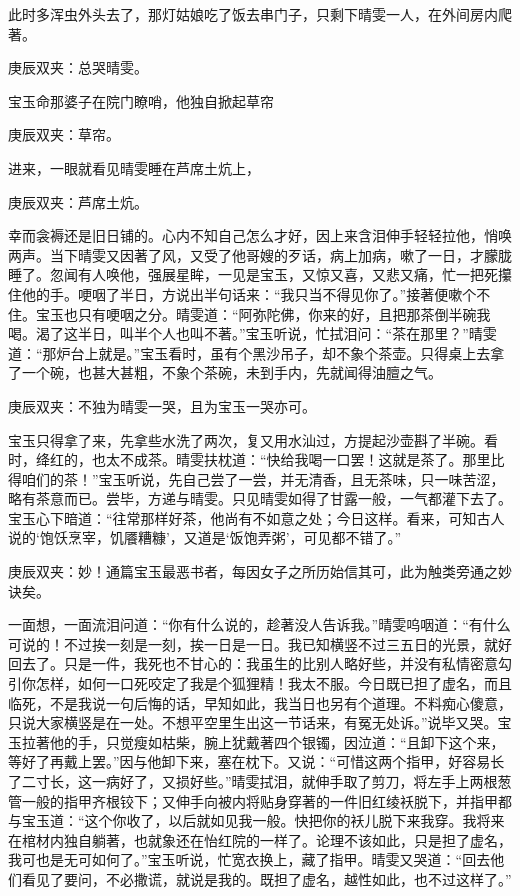 \begin{parag}
    此时多浑虫外头去了，那灯姑娘吃了饭去串门子，只剩下晴雯一人，在外间房内爬著。\begin{note}庚辰双夹：总哭晴雯。\end{note}宝玉命那婆子在院门瞭哨，他独自掀起草帘\begin{note}庚辰双夹：草帘。\end{note}进来，一眼就看见晴雯睡在芦席土炕上，\begin{note}庚辰双夹：芦席土炕。\end{note}幸而衾褥还是旧日铺的。心内不知自己怎么才好，因上来含泪伸手轻轻拉他，悄唤两声。当下晴雯又因著了风，又受了他哥嫂的歹话，病上加病，嗽了一日，才朦胧睡了。忽闻有人唤他，强展星眸，一见是宝玉，又惊又喜，又悲又痛，忙一把死攥住他的手。哽咽了半日，方说出半句话来：“我只当不得见你了。”接著便嗽个不住。宝玉也只有哽咽之分。晴雯道：“阿弥陀佛，你来的好，且把那茶倒半碗我喝。渴了这半日，叫半个人也叫不著。”宝玉听说，忙拭泪问：“茶在那里？”晴雯道：“那炉台上就是。”宝玉看时，虽有个黑沙吊子，却不象个茶壶。只得桌上去拿了一个碗，也甚大甚粗，不象个茶碗，未到手内，先就闻得油膻之气。\begin{note}庚辰双夹：不独为晴雯一哭，且为宝玉一哭亦可。\end{note}宝玉只得拿了来，先拿些水洗了两次，复又用水汕过，方提起沙壶斟了半碗。看时，绛红的，也太不成茶。晴雯扶枕道：“快给我喝一口罢！这就是茶了。那里比得咱们的茶！”宝玉听说，先自己尝了一尝，并无清香，且无茶味，只一味苦涩，略有茶意而已。尝毕，方递与晴雯。只见晴雯如得了甘露一般，一气都灌下去了。宝玉心下暗道：“往常那样好茶，他尚有不如意之处；今日这样。看来，可知古人说的‘饱饫烹宰，饥餍糟糠’，又道是‘饭饱弄粥’，可见都不错了。”\begin{note}庚辰双夹：妙！通篇宝玉最恶书者，每因女子之所历始信其可，此为触类旁通之妙诀矣。\end{note}一面想，一面流泪问道：“你有什么说的，趁著没人告诉我。”晴雯呜咽道：“有什么可说的！不过挨一刻是一刻，挨一日是一日。我已知横竖不过三五日的光景，就好回去了。只是一件，我死也不甘心的：我虽生的比别人略好些，并没有私情密意勾引你怎样，如何一口死咬定了我是个狐狸精！我太不服。今日既已担了虚名，而且临死，不是我说一句后悔的话，早知如此，我当日也另有个道理。不料痴心傻意，只说大家横竖是在一处。不想平空里生出这一节话来，有冤无处诉。”说毕又哭。宝玉拉著他的手，只觉瘦如枯柴，腕上犹戴著四个银镯，因泣道：“且卸下这个来，等好了再戴上罢。”因与他卸下来，塞在枕下。又说：“可惜这两个指甲，好容易长了二寸长，这一病好了，又损好些。”晴雯拭泪，就伸手取了剪刀，将左手上两根葱管一般的指甲齐根铰下；又伸手向被内将贴身穿著的一件旧红绫袄脱下，并指甲都与宝玉道：“这个你收了，以后就如见我一般。快把你的袄儿脱下来我穿。我将来在棺材内独自躺著，也就象还在怡红院的一样了。论理不该如此，只是担了虚名，我可也是无可如何了。”宝玉听说，忙宽衣换上，藏了指甲。晴雯又哭道：“回去他们看见了要问，不必撒谎，就说是我的。既担了虚名，越性如此，也不过这样了。”
\end{parag}


